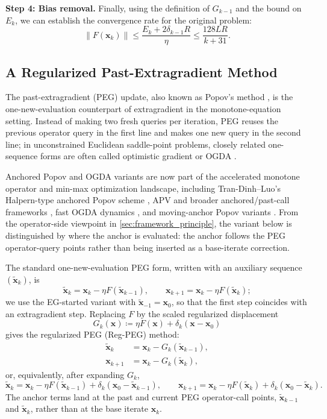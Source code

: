 \documentclass[letterpaper,11pt]{article}
\newcommand{\norm}[1]{\left\| #1 \right\|}
\newcommand{\vect}[1]{\mathbf{#1}}
\begin{document}
\smallskip
\noindent\textbf{Step 4: Bias removal.}
Finally, using the definition of \(G_{k-1}\) and the bound on \(E_k\), we can establish the convergence rate for the original problem:
\begin{equation*}
\norm{F(\vect{x}_k)} \le \frac{E_k + 2\delta_{k-1} R}{\eta} \le \frac{128LR}{k + 31}.
\end{equation*}


\subsection{A Regularized Past-Extragradient Method}
\label{subsec:reg-peg}

The past-extragradient (PEG) update, also known as Popov's method
\cite{popov1980modification}, is the one-new-evaluation counterpart of
extragradient in the monotone-equation setting. Instead of making two fresh
queries per iteration, PEG reuses the previous operator query in the first line
and makes one new query in the second line; in unconstrained Euclidean
saddle-point problems, closely related one-sequence forms are often called
optimistic gradient or OGDA \cite{gorbunov2022last}.

Anchored Popov and OGDA variants are now part of the accelerated monotone
operator and min-max optimization landscape, including Tran-Dinh--Luo's
Halpern-type anchored Popov scheme \cite{tran2021halpern}, APV and broader
anchored/past-call frameworks \cite{boct2024extra,tran2025accelerated}, fast
OGDA dynamics \cite{bot2025fast}, and moving-anchor Popov variants
\cite{alcala2025stochastic}. From the operator-side viewpoint in
\cref{sec:framework_principle}, the variant below is distinguished by where the
anchor is evaluated: the anchor follows the PEG operator-query points rather
than being inserted as a base-iterate correction.

The standard one-new-evaluation PEG form, written with an auxiliary sequence
\((\tilde{\vect{x}}_k)\), is
\[
    \tilde{\vect{x}}_k = \vect{x}_k - \eta F(\tilde{\vect{x}}_{k-1}),
    \qquad
    \vect{x}_{k+1} = \vect{x}_k - \eta F(\tilde{\vect{x}}_k);
\]
we use the EG-started variant with
\(\tilde{\vect{x}}_{-1}=\vect{x}_0\), so that the first step coincides with an
extragradient step. Replacing \(F\) by the scaled regularized displacement
\[
    G_k(\vect{x}) \coloneqq \eta F(\vect{x})+\delta_k(\vect{x}-\vect{x}_0)
\]
gives the regularized PEG (Reg-PEG) method:
\begin{align}
    \tilde{\vect{x}}_k &= \vect{x}_k - G_k(\tilde{\vect{x}}_{k-1}), \label{eq:reg_og_1} \\
    \vect{x}_{k+1} &= \vect{x}_k - G_k(\tilde{\vect{x}}_k), \label{eq:reg_og_2}
\end{align}
or, equivalently, after expanding \(G_k\),
\[
    \tilde{\vect{x}}_k
    =\vect{x}_k-\eta F(\tilde{\vect{x}}_{k-1})
      +\delta_k(\vect{x}_0-\tilde{\vect{x}}_{k-1}),\qquad
    \vect{x}_{k+1}
    =\vect{x}_k-\eta F(\tilde{\vect{x}}_k)
      +\delta_k(\vect{x}_0-\tilde{\vect{x}}_k).
\]
The anchor terms land at the past and current PEG operator-call points,
\(\tilde{\vect{x}}_{k-1}\) and \(\tilde{\vect{x}}_k\), rather than at the base
iterate \(\vect{x}_k\). 
\end{document}

